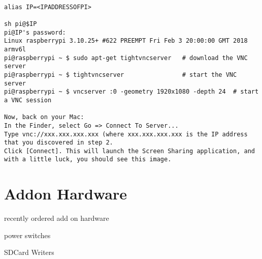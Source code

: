 \begin{lstlisting}

alias IP=<IPADDRESSOFPI>

sh pi@$IP
pi@IP's password: 
Linux raspberrypi 3.10.25+ #622 PREEMPT Fri Feb 3 20:00:00 GMT 2018 armv6l
pi@raspberrypi ~ $ sudo apt-get tightvncserver   # download the VNC server
pi@raspberrypi ~ $ tightvncserver                # start the VNC server
pi@raspberrypi ~ $ vncserver :0 -geometry 1920x1080 -depth 24  # start a VNC session

Now, back on your Mac:
In the Finder, select Go => Connect To Server...
Type vnc://xxx.xxx.xxx.xxx (where xxx.xxx.xxx.xxx is the IP address that you discovered in step 2.
Click [Connect]. This will launch the Screen Sharing application, and
with a little luck, you should see this image.
\end{lstlisting}

\section{Addon Hardware}

recently ordered add on hardware

power switches


SDCard Writers



